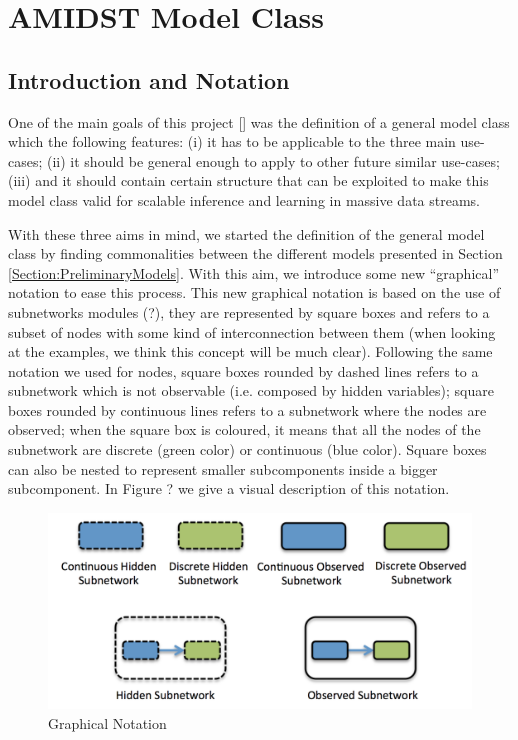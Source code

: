 \section{AMIDST Model Class}

\subsection{Introduction  and Notation}

One of the main goals of this project [] was the definition of a general model class which the following features: (i) it has to be applicable to the three main use-cases; (ii) it should be general enough to apply to other future similar use-cases;  (iii) and it should contain certain structure that can be exploited to make this model class valid for scalable inference and learning in massive data streams. 

With these three aims in mind,  we started the definition of the general model class by finding commonalities between the different models presented in Section \ref{Section:PreliminaryModels}.  With this aim, we  introduce some new ``graphical'' notation to ease this process. This new graphical notation is based on the use of subnetworks modules (?), they are represented by square boxes and refers to a subset of nodes with some kind of interconnection between them (when looking at the examples, we think this concept will be much clear). Following the same notation we used for nodes, square boxes rounded by dashed lines refers to a subnetwork which is not observable (i.e. composed by hidden variables); square boxes rounded by continuous lines refers to a subnetwork where the nodes are observed; when the square box is coloured, it means that all the nodes of the subnetwork are discrete (green color) or continuous (blue color). Square boxes can also be nested to represent smaller subcomponents inside a bigger subcomponent. In Figure ? we give a visual description of this notation. 

\begin{figure}
\begin{center}
\caption{\label{Figure:ModelClass0} Graphical Notation}
\includegraphics[scale=0.4]{./figures/ModelClass0}
\end{center}
\end{figure}

